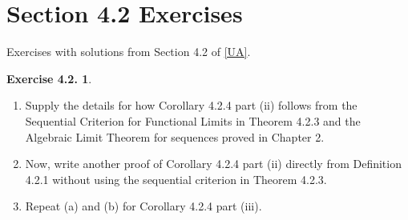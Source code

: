 \documentclass[12pt]{article}
\theoremstyle{definition}
\theoremstyle{exercise}
\newtheorem{exercise}{Exercise 4.2.}
\theoremstyle{solution}
\begin{document}
\section{Section 4.2 Exercises}

Exercises with solutions from Section 4.2 of \hyperlink{ua}{[UA]}.

\begin{exercise}
\label{ex:1}
    \begin{enumerate}
        \item Supply the details for how Corollary 4.2.4 part (ii) follows from the Sequential Criterion for Functional Limits in Theorem 4.2.3 and the Algebraic Limit Theorem for sequences proved in Chapter 2.

        \item Now, write another proof of Corollary 4.2.4 part (ii) directly from Definition 4.2.1 without using the sequential criterion in Theorem 4.2.3.

        \item Repeat (a) and (b) for Corollary 4.2.4 part (iii).
    \end{enumerate}
\end{exercise}
\end{document}
